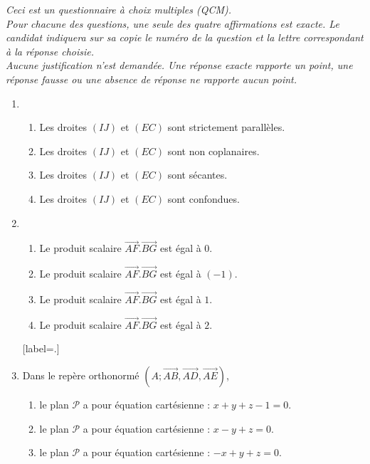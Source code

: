 \textit{Ceci est un questionnaire à choix multiples (QCM). 
\\Pour chacune des questions, une seule des quatre affirmations est exacte. Le candidat indiquera sur sa copie le numéro de la question et la lettre correspondant à la réponse choisie. 
\\Aucune justification n'est demandée. 
Une réponse exacte rapporte un point, une réponse fausse ou une absence de réponse ne rapporte aucun point.}
\begin{enumerate}
     \item
     \begin{enumerate}[label=\alph*.]
          \item
          Les droites $\left(IJ\right)$ et $\left(EC\right)$ sont strictement parallèles.
          \item
          Les droites $\left(IJ\right)$ et $\left(EC\right)$ sont non coplanaires.
          \item
          Les droites $\left(IJ\right)$ et $\left(EC\right)$ sont sécantes.
          \item
     Les droites $\left(IJ\right)$ et $\left(EC\right)$ sont confondues.\end{enumerate}
     \item
     \begin{enumerate}[label=\alph*.]
          \item
          Le produit scalaire $\overrightarrow{AF}.\overrightarrow{BG}$ est égal à $0$.
          \item
          Le produit scalaire $\overrightarrow{AF}.\overrightarrow{BG}$ est égal à $\left(-1\right)$.
          \item
          Le produit scalaire $\overrightarrow{AF}.\overrightarrow{BG}$ est égal à $1$.
          \item
     Le produit scalaire $\overrightarrow{AF}.\overrightarrow{BG}$ est égal à $2$.\end{enumerate}[label=\alph*.]
     \item
     Dans le repère orthonormé $\left(A ;  \overrightarrow{AB}, \overrightarrow{AD}, \overrightarrow{AE}\right)$,
     \begin{enumerate}
          \item
          le plan $\mathscr P$ a pour équation cartésienne : $x+y+z-1=0$.
          \item
          le plan $\mathscr P$ a pour équation cartésienne : $x-y+z=0$.
          \item
          le plan $\mathscr P$ a pour équation cartésienne : $-x+y+z=0$.

\end{enumerate}
\end{enumerate}
